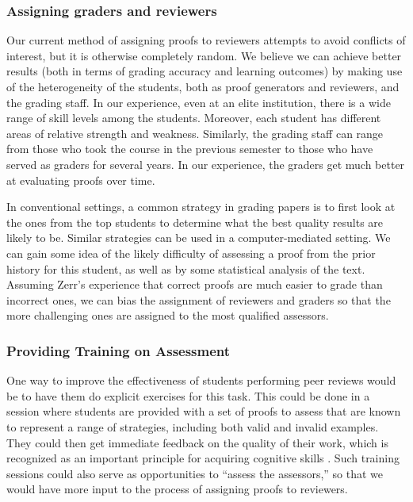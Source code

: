 \documentclass[12pt]{article}
\begin{document}
\subsubsection*{Assigning graders and reviewers}

Our current method of assigning proofs to reviewers attempts to avoid
conflicts of interest, but it is otherwise completely random.  We
believe we can achieve better results (both in terms of grading accuracy and learning outcomes) by making use of the
heterogeneity of the students, both as proof generators and reviewers,
and the grading staff.  In our experience, even at an elite
institution, there is a wide range of skill levels among the students.
Moreover, each student has different areas of relative strength and
weakness.  Similarly, the grading staff can range from those who took
the course in the previous semester to those who have served as
graders for several years.  In our experience, the graders get much
better at evaluating proofs over time.

In conventional settings, a common strategy in grading papers is to
first look at the ones from the top students to determine what the
best quality results are likely to be.  Similar strategies can be used
in a computer-mediated setting.  We can gain some idea of the likely
difficulty of assessing a proof from the prior history for this
student, as well as by some statistical analysis of the text.
Assuming Zerr's experience that correct proofs are much easier to
grade than incorrect ones, we can bias the assignment of reviewers and
graders so that the more challenging ones are assigned to the most
qualified assessors.

\subsubsection*{Providing Training on Assessment}

One way to improve the effectiveness of students performing peer
reviews would be to have them do explicit exercises for this task.
This could be done in a session where students are provided with a set
of proofs to assess that are known to represent a range of strategies,
including both valid and invalid examples.  They could then get
immediate feedback on the quality of their work, which is recognized
as an important principle for acquiring cognitive skills
\citep{anderson-jls95}.  Such training sessions could also serve as
opportunities to ``assess the assessors,'' so that we would have more
input to the process of assigning proofs to reviewers.
\end{document}
